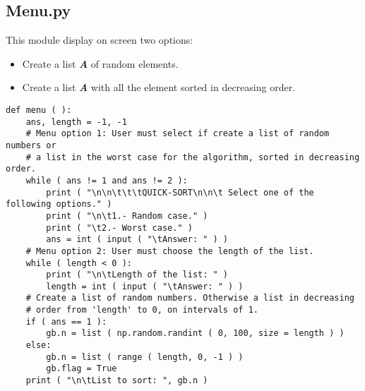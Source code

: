 \subsection{Menu.py}

This module display on screen two options:

\begin{itemize}
\item Create a list {\bfseries\itshape A} of random elements.
\item Create a list {\bfseries\itshape A} with all the element sorted in decreasing order. 
\end{itemize}

\begin{flushleft}
{\bfseries\itshape\color{armygreen}{Observation:}} {\itshape{}} \hfill \break

{\bfseries\itshape\color{armygreen}{Observation:}} {\itshape{}} \hfill \break
\end{flushleft}

\begin{lstlisting}
def menu ( ):
    ans, length = -1, -1
    # Menu option 1: User must select if create a list of random numbers or
    # a list in the worst case for the algorithm, sorted in decreasing order.
    while ( ans != 1 and ans != 2 ):
        print ( "\n\n\t\t\tQUICK-SORT\n\n\t Select one of the following options." )
        print ( "\n\t1.- Random case." )
        print ( "\t2.- Worst case." )
        ans = int ( input ( "\tAnswer: " ) )
    # Menu option 2: User must choose the length of the list.
    while ( length < 0 ):
        print ( "\n\tLength of the list: " )
        length = int ( input ( "\tAnswer: " ) )
    # Create a list of random numbers. Otherwise a list in decreasing
    # order from 'length' to 0, on intervals of 1.
    if ( ans == 1 ):
        gb.n = list ( np.random.randint ( 0, 100, size = length ) )
    else:
        gb.n = list ( range ( length, 0, -1 ) )
        gb.flag = True
    print ( "\n\tList to sort: ", gb.n )
\end{lstlisting} \hfill

